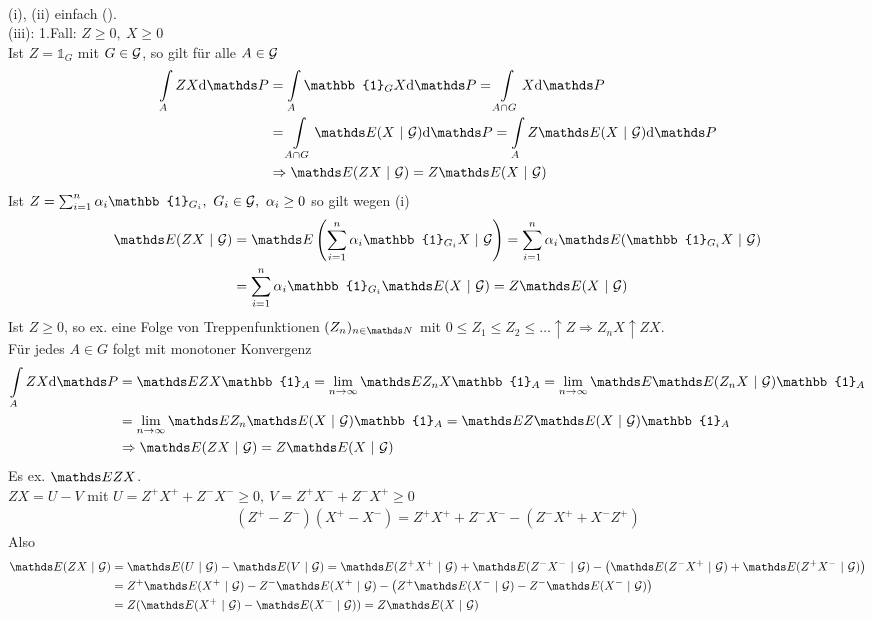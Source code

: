 \\
(i), (ii) einfach (\checkmark).\\
(iii): 1.Fall: $Z\ge 0,~X\ge0$\\
Ist $Z=\mathbb{1}_G$ mit $G\in \mathcal{G}$, so gilt für alle $A\in \mathcal{G}$ 
\begin{equation*}
\begin{aligned}
	\int\limits_A ZX\dint \Pw &=\int\limits_A \mathbb{1}_G X\dint \Pw =\int\limits_{A\cap G}X\dint\Pw\\
	&= \int\limits_{A\cap G}\E(X~|~\G)\dint\Pw =\int\limits_A Z\E(X~|~\G)\dint\Pw\\
	&\Rightarrow \E(ZX~|~\G)=Z\E(X~|~\G)
\end{aligned}
\end{equation*}
Ist $Z=\sum_{i=1}^{n}\alpha_i \mathbb{1}_{G_i},~ G_i\in \G,~\alpha_i\ge 0$ so gilt wegen (i)
\begin{equation*}
\begin{aligned}
	\E(ZX~|~\G)&=\E\enbrace{\sum_{i=1}^{n}\alpha_i\mathbb{1}_{G_i}X~|~\G}= \sum_{i=1}^{n}\alpha_i\E(\mathbb{1}_{G_i}X~|~\G)\\
	&= \sum_{i=1}^{n}\alpha_i\mathbb{1}_{G_i}\E(X~|~\G)=Z\E(X~|~\G)
\end{aligned}
\end{equation*}
Ist $Z\ge0$, so ex. eine Folge von Treppenfunktionen $(Z_n)_{n\in \N}$ mit $0\le Z_1\le Z_2\le \dots \uparrow Z \Rightarrow Z_nX\uparrow ZX$.\\
Für jedes $A\in G$ folgt mit monotoner Konvergenz 
\begin{equation*}
\begin{aligned}
	\int\limits_A ZX\dint\Pw &= \E ZX\mathbb{1}_A = \lim\limits_{n\to\infty}\E Z_nX\mathbb{1}_A =\lim\limits_{n\to\infty} \E\E(Z_nX~|~\G)\mathbb{1}_A\\
	&=\lim\limits_{n\to \infty}\E Z_n\E(X~|~\G)\mathbb{1}_A=\E Z\E(X~|~\G)\mathbb{1}_A\\
	&\Rightarrow \E(ZX~|~\G)=Z\E(X~|~\G)
\end{aligned}
\end{equation*}
Es ex. $\E ZX$.\\ $ZX=U-V$ mit $U=Z^+X^++Z^-X^-\ge0,~V=Z^+X^-+Z^-X^+\ge0$
\begin{equation*}
\begin{aligned}
	(Z^+-Z^-)(X^+-X^-)= Z^+X^++Z^-X^- -(Z^-X^++X^-Z^+)
\end{aligned}
\end{equation*}
Also \begin{equation*}
\begin{aligned}
	\E(ZX~|~\G) &= \E(U~|~\G)-\E(V~|~\G)= \E(Z^+X^+~|~\G)+\E(Z^-X^-~|~\G)-\big(\E(Z^-X^+~|~\G)+\E(Z^+X^-~|~\G)\big)\\
	&= Z^+\E(X^+~|~\G)-Z^-\E(X^+~|~\G)-\big(Z^+\E(X^-~|~\G)-Z^-\E(X^-~|~\G)\big)\\
	&= Z(\E(X^+~|~\G)-\E(X^-~|~\G)) = Z\E(X~|~\G)
\end{aligned}
\end{equation*}

